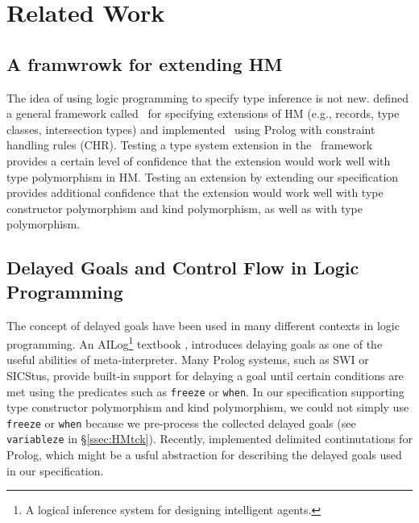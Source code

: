\section{Related Work}\label{sec:relwork}
\subsection{A framwrowk for extending HM}
The idea of using logic programming to specify type inference is not new.
\citet*{HMX99} defined a general framework called \HMX\ for specifying
extensions of HM (e.g., records, type classes, intersection types)
and \citet{tyinferCHR02} implemented \HMX\ using Prolog with
constraint handling rules (CHR). Testing a type system extension
in the \HMX\ framework provides a certain level of confidence that the extension
would work well with type polymorphism in HM. Testing an extension by
extending our specification provides additional confidence that the extension
would work well with type constructor polymorphism and kind polymorphism,
as well as with type polymorphism.

\subsection{Delayed Goals and Control Flow in Logic Programming}
The concept of delayed goals have been used in many different contexts
in logic programming. An AILog\footnote{A logical inference system for designing
	 intelligent agents.} textbook \cite{AILogTextBook},
introduces delaying goals as one of the useful abilities of meta-interpreter.
Many Prolog systems, such as SWI or SICStus, provide built-in support for
delaying a goal until certain conditions are met using the predicates
such as \verb|freeze| or \verb|when|. In our specification supporting
type constructor polymorphism and kind polymorphism, we could not
simply use \verb|freeze| or \verb|when| because we pre-process
the collected delayed goals (see \verb|variableze| in \S\ref{ssec:HMtck}).
Recently, \citet{SchDemDesWei13} implemented delimited continutations for
Prolog, which might be a usful abstraction for describing the delayed goals
used in our specification.

